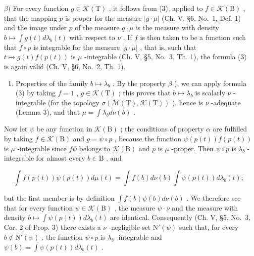 \(\beta)\) For every function \(g \in \overline{\mathcal{K}(\mathrm{T})}\) , it follows from (3), applied to \(f \in \mathcal{K}(\mathrm{B})\) , that the mapping \(p\) is proper for the measure \(|g \cdot \mu|\) (Ch. V, §6, No.~1, Def. 1) and the image under \(p\) of the measure \(g \cdot \mu\) is the measure with density \(b \mapsto \int g(t) d\lambda_b(t)\) with respect to \(\nu\) . If \(f\) is then taken to be a function such that \(f \circ p\) is integrable for the measure \(|g \cdot \mu|\) , that is, such that \(t \mapsto g(t)f(p(t))\) is \(\mu\) -integrable (Ch. V, §5, No.~3, Th. 1), the formula (3) is again valid (Ch. V, §6, No.~2, Th. 1).

\begin{enumerate}
\def\labelenumi{\arabic{enumi})}
\setcounter{enumi}{3}
\tightlist
\item
  Properties of the family \(b \mapsto \lambda_b\) . By the property \(\beta\) ), we can apply formula (3) by taking \(f = 1\) , \(g \in \mathcal{K}(\mathrm{T})\) ; this proves that \(b \mapsto \lambda_b\) is scalarly \(\nu\) -integrable (for the topology \(\sigma(\mathcal{M}(\mathrm{T}), \mathcal{K}(\mathrm{T}))\) ), hence is \(\nu\) -adequate (Lemma 3), and that \(\mu = \int \lambda_b d\nu(b)\) .
\end{enumerate}

Now let \(\psi\) be any function in \(\mathcal{K}(\mathrm{B})\) ; the conditions of property \(\alpha\) are fulfilled by taking \(f \in \mathcal{K}(\mathrm{B})\) and \(g = \psi \circ p\) , because the function \(\psi(p(t))f(p(t))\) is \(\mu\) -integrable since \(f\psi\) belongs to \(\mathcal{K}(\mathrm{B})\) and \(p\) is \(\mu\) -proper. Then \(\psi \circ p\) is \(\lambda_b\) -integrable for almost every \(b \in \mathrm{B}\) , and

\[
\int f (p (t)) \psi (p (t)) d \mu (t) = \int f (b) d \nu (b) \int \psi (p (t)) d \lambda_ {b} (t);
\]

but the first member is by definition \(\int f(b)\psi (b)d\nu (b)\) . We therefore see that for every function \(\psi \in \mathcal{K}(\mathrm{B})\) , the measure \(\psi \cdot \nu\) and the measure with density \(b\mapsto \int \psi (p(t))d\lambda_b(t)\) are identical. Consequently (Ch. V, §5, No.~3, Cor. 2 of Prop. 3) there exists a \(\nu\) -negligible set \(\mathrm{N}'(\psi)\) such that, for every \(b\notin \mathrm{N}'(\psi)\) , the function \(\psi \circ p\) is \(\lambda_{b}\) -integrable and \(\psi (b) = \int \psi (p(t))d\lambda_b(t)\) .

